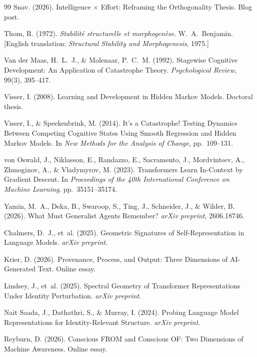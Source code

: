 \documentclass[12pt]{article}
\begin{document}
\begin{thebibliography}{99}
Snav. (2026).
Intelligence $\times$ Effort: Reframing the Orthogonality Thesis.
Blog post.

Thom, R. (1972).
\textit{Stabilit\'{e} structurelle et morphogen\`{e}se}.
W.~A.\ Benjamin.
[English translation: \textit{Structural Stability and Morphogenesis}, 1975.]

Van der Maas, H.~L.~J., \& Molenaar, P.~C.~M. (1992).
Stagewise Cognitive Development: An Application of Catastrophe Theory.
\textit{Psychological Review}, 99(3), 395--417.

Visser, I. (2008).
Learning and Development in Hidden Markov Models.
Doctoral thesis.

Visser, I., \& Speekenbrink, M. (2014).
It's a Catastrophe! Testing Dynamics Between Competing Cognitive States Using Smooth Regression and Hidden Markov Models.
In \textit{New Methods for the Analysis of Change}, pp.~109--131.

von Oswald, J., Niklasson, E., Randazzo, E., Sacramento, J., Mordvintsev, A., Zhmoginov, A., \& Vladymyrov, M. (2023).
Transformers Learn In-Context by Gradient Descent.
In \textit{Proceedings of the 40th International Conference on Machine Learning}, pp.~35151--35174.

Yamin, M.~A., Deka, B., Swaroop, S., Ting, J., Schneider, J., \& Wilder, B. (2026).
What Must Generalist Agents Remember?
\textit{arXiv preprint}, 2606.18746.

Chalmers, D.~J., et~al. (2025).
Geometric Signatures of Self-Representation in Language Models.
\textit{arXiv preprint}.

Krier, D. (2026).
Provenance, Process, and Output: Three Dimensions of AI-Generated Text.
Online essay.

Lindsey, J., et~al. (2025).
Spectral Geometry of Transformer Representations Under Identity Perturbation.
\textit{arXiv preprint}.

Nait Saada, J., Dathathri, S., \& Murray, I. (2024).
Probing Language Model Representations for Identity-Relevant Structure.
\textit{arXiv preprint}.

Reyburn, D. (2026).
Conscious FROM and Conscious OF: Two Dimensions of Machine Awareness.
Online essay.

\end{thebibliography}
\end{document}
